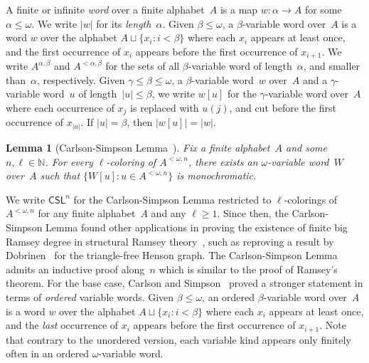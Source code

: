 \documentclass{article}
\newcommand{\CSL}[0]{\mathsf{CSL}}
\newcommand{\NN}[0]{\mathbb{N}}
\numberwithin{theorem}{section}
\newtheorem{lemma}[theorem]{Lemma}
\theoremstyle{definition}
\begin{document}
A finite or infinite \emph{word} over a finite alphabet~$A$ is a map $w : \alpha \to A$ for some~$\alpha \leq \omega$.
We write $|w|$ for its \emph{length}~$\alpha$. Given $\beta \leq \omega$, a $\beta$-variable word over~$A$ is a word $w$ over the alphabet $A \sqcup \{ x_i : i < \beta \}$ where each $x_i$ appears at least once, and the first occurrence of $x_i$ appears before the first occurrence of $x_{i+1}$. We write $A^{\alpha, \beta}$ and $A^{<\alpha, \beta}$ for the sets of all $\beta$-variable word of length~$\alpha$, and smaller than~$\alpha$, respectively. Given $\gamma \leq \beta \leq \omega$, a $\beta$-variable word~$w$ over~$A$ and a $\gamma$-variable word~$u$ of length~$|u| \leq \beta$, we write $w[u]$ for the $\gamma$-variable word over~$A$ where each occurrence of $x_j$ is replaced with $u(j)$, and cut before the first occurrence of $x_{|u|}$. If $|u| = \beta$, then $|w[u]| = |w|$.

\begin{lemma}[Carlson-Simpson Lemma~\cite{carlson1984dual}]
Fix a finite alphabet~$A$ and some $n, \ell \in \NN$. For every $\ell$-coloring of $A^{<\omega, n}$,
there exists an $\omega$-variable word~$W$ over~$A$ such that $\{ W[u] : u \in A^{<\omega, n} \}$ is monochromatic.
\end{lemma}

We write $\CSL^n$ for the Carlson-Simpson Lemma restricted to $\ell$-colorings of $A^{<\omega, n}$ for any finite alphabet~$A$ and any $\ell \geq 1$. Since then, the Carlson-Simpson Lemma found other applications in proving the existence of finite big Ramsey degree in structural Ramsey theory~\cite{hubivcka2020big}, such as reproving a result by Dobrinen~\cite{dobrinen2020ramsey} for the triangle-free Henson graph.
The Carlson-Simpson Lemma admits an inductive proof along~$n$ which is similar to the proof of Ramsey's theorem. For the base case, Carlson and Simpson~\cite[Theorem 6.3]{carlson1984dual} proved a stronger statement in terms of \emph{ordered} variable words. Given $\beta \leq \omega$, an ordered $\beta$-variable word over~$A$ is a word $w$ over the alphabet $A \sqcup \{ x_i : i < \beta \}$ where each $x_i$ appears at least once, and the \emph{last} occurrence of $x_i$ appears before the first occurrence of $x_{i+1}$. Note that contrary to the unordered version, each variable kind appears only finitely often in an ordered $\omega$-variable word. %
\end{document}
